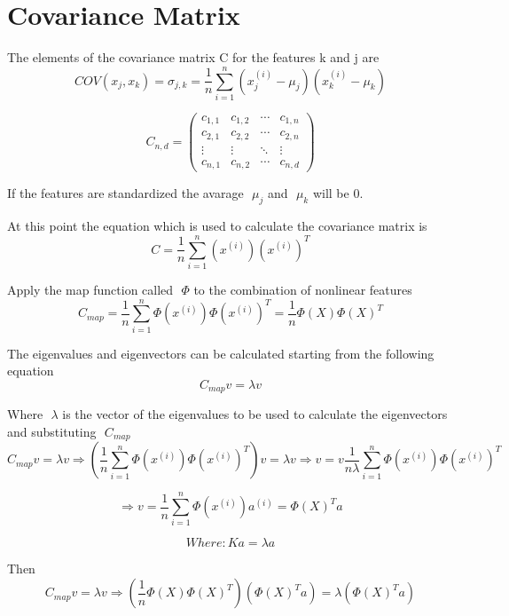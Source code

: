 \documentclass[11pt]{article}
\begin{document}
\section{Covariance Matrix}
The elements of the covariance matrix C for the features k and j are
\begin{equation*}
COV(x_j, x_k) = \sigma_{j,k} = \dfrac{1}{n}\sum_{i = 1}^{n} (x^{(i)}_j - \mu_{j})(x^{(i)}_k - \mu_{k})
\end{equation*}

\begin{equation*}
C_{n,d} = 
\begin{pmatrix}
c_{1,1} & c_{1,2} & \cdots & c_{1,n} \\
c_{2,1} & c_{2,2} & \cdots & c_{2,n} \\
\vdots  & \vdots  & \ddots & \vdots  \\
c_{n,1} & c_{n,2} & \cdots & c_{n,d} 
\end{pmatrix}
\end{equation*}

If the features are standardized the avarage \( \) $ \mu_{j} $ and \( \) $ \mu_{k} $ will be 0.

At this point the equation which is used to calculate the covariance matrix is
\begin{equation*}
C = \dfrac{1}{n}\sum_{i = 1}^{n} (x^{(i)})(x^{(i)})^T
\end{equation*}

Apply the map function called \( \) $ \Phi $ to the combination of nonlinear features
\begin{equation*}
C_{map} = \dfrac{1}{n}\sum_{i = 1}^{n} \Phi(x^{(i)})\Phi(x^{(i)})^T = \dfrac{1}{n}\Phi(X)\Phi(X)^T
\end{equation*}

The eigenvalues and eigenvectors can be calculated starting from the following equation
\begin{equation*}
C_{map}v = \lambda v 
\end{equation*}

Where \( \) $ \lambda $ is the vector of the eigenvalues to be used to calculate the eigenvectors and substituting \( \) $ C_{map} $ 
\begin{equation*}
C_{map}v = \lambda v \Rightarrow (\dfrac{1}{n}\sum_{i = 1}^{n} \Phi(x^{(i)})\Phi(x^{(i)})^T)v = \lambda v 
\Rightarrow v = v\dfrac{1}{n\lambda}\sum_{i = 1}^{n} \Phi(x^{(i)})\Phi(x^{(i)})^T
\end{equation*}

\begin{equation*}
\Rightarrow v = \dfrac{1}{n}\sum_{i = 1}^{n} \Phi(x^{(i)})a^{(i)} = \Phi(X)^Ta
\end{equation*}

\begin{equation*}
Where: Ka = \lambda a
\end{equation*}

Then
\begin{equation*}
C_{map}v = \lambda v \Rightarrow (\dfrac{1}{n}\Phi(X)\Phi(X)^T)(\Phi(X)^Ta) = \lambda(\Phi(X)^Ta)
\end{equation*}
\end{document}
